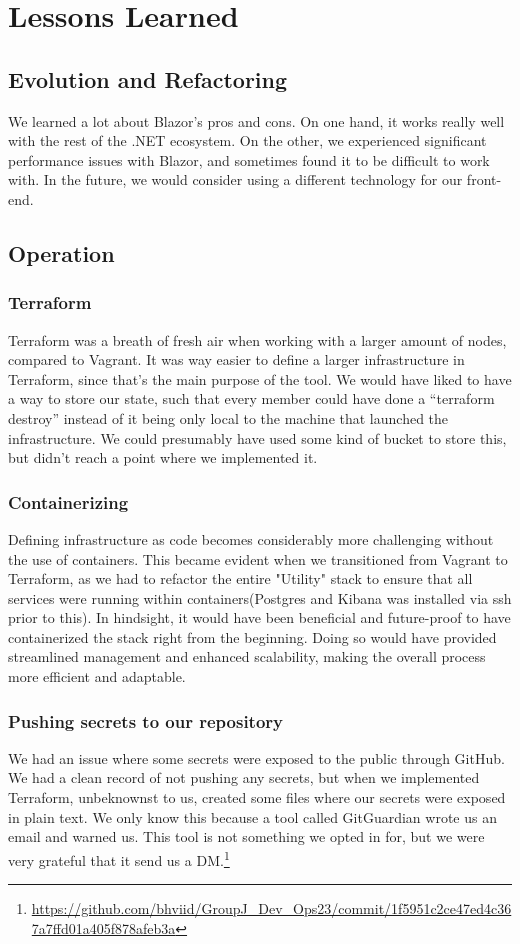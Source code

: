 \section{Lessons Learned}
\subsection{Evolution and Refactoring}
We learned a lot about Blazor's pros and cons. On one hand, it works really well with the rest of the .NET ecosystem. On the other, we experienced significant performance issues with Blazor, and sometimes found it to be difficult to work with. In the future, we would consider using a different technology for our front-end.
\subsection{Operation}
\subsubsection{Terraform}
Terraform was a breath of fresh air when working with a larger amount of nodes, compared to Vagrant. It was way easier to define a larger infrastructure in Terraform, since that's the main purpose of the tool. We would have liked to have a way to store our state, such that every member could have done a “terraform destroy” instead of it being only local to the machine that launched the infrastructure. We could presumably have used some kind of
bucket to store this, but didn't reach a point where we implemented it.


\subsubsection{Containerizing}
Defining infrastructure as code becomes considerably more challenging without the use of containers. This became evident when we transitioned from Vagrant to Terraform, as we had to refactor the entire "Utility" stack to ensure that all services were running within containers(Postgres and Kibana was installed via ssh prior to this). In hindsight, it would have been beneficial and future-proof to have containerized the stack right from the beginning. Doing so would have provided streamlined management and enhanced scalability, making the overall process more efficient and adaptable.
\subsubsection{Pushing secrets to our repository}
We had an issue where some secrets were exposed to the public through GitHub. We had a clean record of not pushing any secrets, but when we implemented Terraform, unbeknownst to us, created some files where our secrets were exposed in plain text. We only know this because a tool called GitGuardian wrote us an email and warned us. This tool is not something we opted in for, but we were very grateful that it send us a DM.\footnote{\url{https://github.com/bhviid/GroupJ_Dev_Ops23/commit/1f5951c2ce47ed4c367a7ffd01a405f878afeb3a}}
